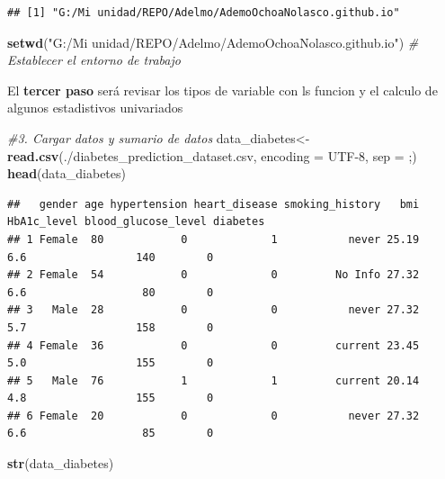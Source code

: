 \documentclass[
]{article}
\newenvironment{Shaded}{\begin{snugshade}}{\end{snugshade}}
\newcommand{\AttributeTok}[1]{\textcolor[rgb]{0.13,0.29,0.53}{#1}}
\newcommand{\CommentTok}[1]{\textcolor[rgb]{0.56,0.35,0.01}{\textit{#1}}}
\newcommand{\FunctionTok}[1]{\textcolor[rgb]{0.13,0.29,0.53}{\textbf{#1}}}
\newcommand{\NormalTok}[1]{#1}
\newcommand{\OtherTok}[1]{\textcolor[rgb]{0.56,0.35,0.01}{#1}}
\newcommand{\StringTok}[1]{\textcolor[rgb]{0.31,0.60,0.02}{#1}}
\begin{document}
\begin{verbatim}
## [1] "G:/Mi unidad/REPO/Adelmo/AdemoOchoaNolasco.github.io"
\end{verbatim}

\begin{Shaded}
\begin{Highlighting}[]
\FunctionTok{setwd}\NormalTok{(}\StringTok{"G:/Mi unidad/REPO/Adelmo/AdemoOchoaNolasco.github.io"}\NormalTok{)  }\CommentTok{\# Establecer el entorno de trabajo}
\end{Highlighting}
\end{Shaded}

El \textbf{tercer paso} será revisar los tipos de variable con ls
funcion y el calculo de algunos estadistivos univariados

\begin{Shaded}
\begin{Highlighting}[]
\CommentTok{\#3. Cargar datos y sumario de datos}
\NormalTok{data\_diabetes}\OtherTok{\textless{}{-}}\FunctionTok{read.csv}\NormalTok{(}\StringTok{\textquotesingle{}./diabetes\_prediction\_dataset.csv\textquotesingle{}}\NormalTok{, }\AttributeTok{encoding =} \StringTok{\textquotesingle{}UTF{-}8\textquotesingle{}}\NormalTok{, }\AttributeTok{sep =} \StringTok{\textquotesingle{};\textquotesingle{}}\NormalTok{)}
\FunctionTok{head}\NormalTok{(data\_diabetes)}
\end{Highlighting}
\end{Shaded}

\begin{verbatim}
##   gender age hypertension heart_disease smoking_history   bmi HbA1c_level blood_glucose_level diabetes
## 1 Female  80            0             1           never 25.19         6.6                 140        0
## 2 Female  54            0             0         No Info 27.32         6.6                  80        0
## 3   Male  28            0             0           never 27.32         5.7                 158        0
## 4 Female  36            0             0         current 23.45         5.0                 155        0
## 5   Male  76            1             1         current 20.14         4.8                 155        0
## 6 Female  20            0             0           never 27.32         6.6                  85        0
\end{verbatim}

\begin{Shaded}
\begin{Highlighting}[]
\FunctionTok{str}\NormalTok{(data\_diabetes)}
\end{Highlighting}
\end{Shaded}
\end{document}
